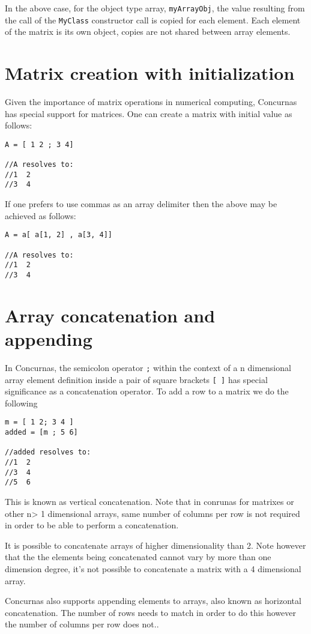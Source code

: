 \documentclass[conc-doc]{subfiles}
\begin{document}
In the above case, for the object type array, \lstinline{myArrayObj}, the value resulting from the call of the \lstinline{MyClass} constructor call is copied for each element. Each element of the matrix is its own object, copies are not shared between array elements.

\section{Matrix creation with initialization}
Given the importance of matrix operations in numerical computing, Concurnas has special support for matrices. One can create a matrix with initial value as follows:
\begin{lstlisting}
A = [ 1 2 ; 3 4]

//A resolves to:
//1  2
//3  4
\end{lstlisting}

If one prefers to use commas as an array delimiter then the above may be achieved as follows:
\begin{lstlisting}
A = a[ a[1, 2] , a[3, 4]]

//A resolves to:
//1  2
//3  4
\end{lstlisting}

\section{Array concatenation and appending}
In Concurnas, the semicolon operator \lstinline{;} within the context of a n dimensional array element definition inside a pair of square brackets \lstinline{[ ]} has special significance as a concatenation operator. To add a row to a matrix we do the following
\begin{lstlisting}
m = [ 1 2; 3 4 ]
added = [m ; 5 6]

//added resolves to:
//1	 2
//3	 4
//5  6
\end{lstlisting}

This is known as vertical concatenation. Note that in conrunas for matrixes or other n> 1 dimensional arrays, same number of columns per row is not required in order to be able to perform a concatenation.

It is possible to concatenate arrays of higher dimensionality than 2. Note however that the the elements being concatenated cannot vary by more than one dimension degree, it’s not possible to concatenate a matrix with a 4 dimensional array.

Concurnas also supports appending elements to arrays, also known as horizontal concatenation. The number of rows needs to match in order to do this however the number of columns per row does not..
\end{document}
